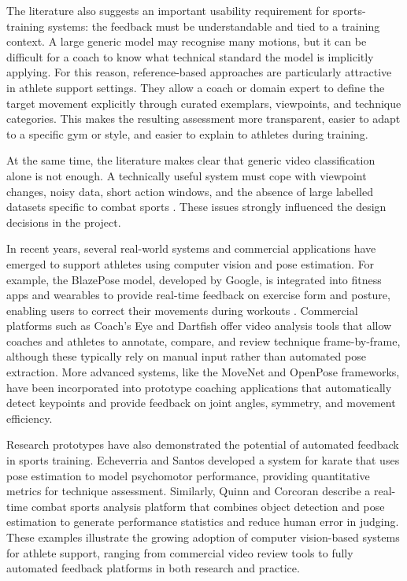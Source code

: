 \documentclass[12pt]{article}
\begin{document}
The literature also suggests an important usability requirement for sports-training systems: the feedback must be understandable and tied to a training context. A large generic model may recognise many motions, but it can be difficult for a coach to know what technical standard the model is implicitly applying. For this reason, reference-based approaches are particularly attractive in athlete support settings. They allow a coach or domain expert to define the target movement explicitly through curated exemplars, viewpoints, and technique categories. This makes the resulting assessment more transparent, easier to adapt to a specific gym or style, and easier to explain to athletes during training.

At the same time, the literature makes clear that generic video classification alone is not enough. A technically useful system must cope with viewpoint changes, noisy data, short action windows, and the absence of large labelled datasets specific to combat sports \cite{wu2024sthka,quinn2025yolo}. These issues strongly influenced the design decisions in the project.

In recent years, several real-world systems and commercial applications have emerged to support athletes using computer vision and pose estimation. For example, the BlazePose model, developed by Google, is integrated into fitness apps and wearables to provide real-time feedback on exercise form and posture, enabling users to correct their movements during workouts \cite{wu2024sthka}. Commercial platforms such as Coach's Eye and Dartfish offer video analysis tools that allow coaches and athletes to annotate, compare, and review technique frame-by-frame, although these typically rely on manual input rather than automated pose extraction. More advanced systems, like the MoveNet and OpenPose frameworks, have been incorporated into prototype coaching applications that automatically detect keypoints and provide feedback on joint angles, symmetry, and movement efficiency.

Research prototypes have also demonstrated the potential of automated feedback in sports training. Echeverria and Santos \cite{echeverria2021pose} developed a system for karate that uses pose estimation to model psychomotor performance, providing quantitative metrics for technique assessment. Similarly, Quinn and Corcoran \cite{quinn2024automation} describe a real-time combat sports analysis platform that combines object detection and pose estimation to generate performance statistics and reduce human error in judging. These examples illustrate the growing adoption of computer vision-based systems for athlete support, ranging from commercial video review tools to fully automated feedback platforms in both research and practice.
\end{document}
